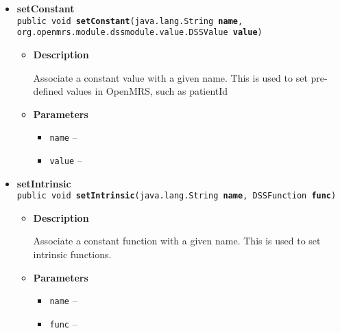 {{{\begin{itemize}
{\begin{itemize}
{Retrieve a named function.
}
\item{
{\bf  Parameters}
  \begin{itemize}
   \item{
\texttt{name} -- the name of the function}
  \end{itemize}
}%
\item{{\bf  Returns} -- 
an object which handles calls to the function 
}%
\end{itemize}
}%
\item{ 
\hypertarget{org.openmrs.module.dssmodule.state.DSSExecutionContext.setConstant(java.lang.String, org.openmrs.module.dssmodule.value.DSSValue)}{{\bf  setConstant}\\}
\texttt{public void\ {\bf  setConstant}(\texttt{java.lang.String} {\bf  name},
\texttt{org.openmrs.module.dssmodule.value.DSSValue} {\bf  value})
\label{org.openmrs.module.dssmodule.state.DSSExecutionContext.setConstant(java.lang.String, org.openmrs.module.dssmodule.value.DSSValue)}}%
\begin{itemize}
\item{
{\bf  Description}

Associate a constant value with a given name. This is used to set pre-defined values in OpenMRS, such as patientId
}
\item{
{\bf  Parameters}
  \begin{itemize}
   \item{
\texttt{name} -- }
   \item{
\texttt{value} -- }
  \end{itemize}
}%
\end{itemize}
}%
\item{ 
\hypertarget{org.openmrs.module.dssmodule.state.DSSExecutionContext.setIntrinsic(java.lang.String, org.openmrs.module.dssmodule.state.DSSFunction)}{{\bf  setIntrinsic}\\}
\texttt{public void\ {\bf  setIntrinsic}(\texttt{java.lang.String} {\bf  name},
\texttt{DSSFunction} {\bf  func})
\label{org.openmrs.module.dssmodule.state.DSSExecutionContext.setIntrinsic(java.lang.String, org.openmrs.module.dssmodule.state.DSSFunction)}}%
\begin{itemize}
\item{
{\bf  Description}

Associate a constant function with a given name. This is used to set intrinsic functions.
}
\item{
{\bf  Parameters}
  \begin{itemize}
   \item{
\texttt{name} -- }
   \item{
\texttt{func} -- }
  \end{itemize}
}%
\end{itemize}
}%
\end{itemize}
}
}}

